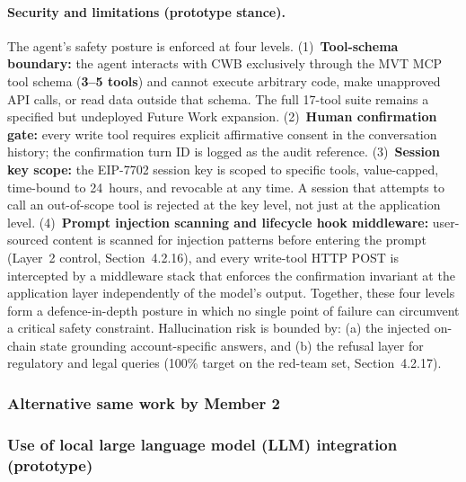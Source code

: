 \documentclass[12pt,a4paper]{article}
\begin{document}
\paragraph{Security and limitations (prototype stance).}
The agent's safety posture is enforced at four levels. (1)~\textbf{Tool-schema boundary:} the agent interacts with CWB exclusively through the MVT MCP tool schema (\textbf{3--5 tools}) and cannot execute arbitrary code, make unapproved API calls, or read data outside that schema. The full 17-tool suite remains a specified but undeployed Future Work expansion. (2)~\textbf{Human confirmation gate:} every write tool requires explicit affirmative consent in the conversation history; the confirmation turn ID is logged as the audit reference. (3)~\textbf{Session key scope:} the EIP-7702 session key is scoped to specific tools, value-capped, time-bound to 24~hours, and revocable at any time. A session that attempts to call an out-of-scope tool is rejected at the key level, not just at the application level. (4)~\textbf{Prompt injection scanning and lifecycle hook middleware:} user-sourced content is scanned for injection patterns before entering the prompt (Layer~2 control, Section~4.2.16), and every write-tool HTTP POST is intercepted by a middleware stack that enforces the confirmation invariant at the application layer independently of the model's output. Together, these four levels form a defence-in-depth posture in which no single point of failure can circumvent a critical safety constraint. Hallucination risk is bounded by: (a) the injected on-chain state grounding account-specific answers, and (b) the refusal layer for regulatory and legal queries (100\% target on the red-team set, Section~4.2.17).

\newpage

\subsubsection{Alternative same work by Member 2}

\subsubsection{Use of local large language model (LLM) integration (prototype)}
\label{sec:local-llm-member2}
\end{document}

